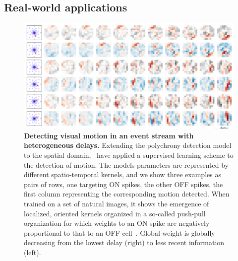 \documentclass[brainsci, %
               review,submit,pdftex,moreauthors
               ]{Definitions/mdpi}
\begin{document}
\subsection{Real-world applications}
\begin{figure}%
  \centering
  \includegraphics[width=0.980\linewidth]{figures/2022-09-27_MotionDetection_kernel.png}
    \caption{\textbf{Detecting visual motion in an event stream with heterogeneous delays.} Extending the polychrony detection model to the spatial domain,~\citet{grimaldi_learning_2022} have applied a supervised learning scheme to the detection of motion. The models parameters are represented by different spatio-temporal kernels, and we show three examples as pairs of rows, one targeting ON spikes, the other OFF spikes, the first column representing the corresponding motion detected. When trained on a set of natural images, it shows the emergence of localized, oriented kernels organized in a so-called push-pull organization for which weights to an ON spike are negatively proportional to that to an OFF cell~\citep{kremkow_push-pull_2016}. Global weight is globally decreasing from the lowest delay (right) to less recent information (left).
     }
  \label{fig:icip}
\end{figure}
% 
\end{document}
